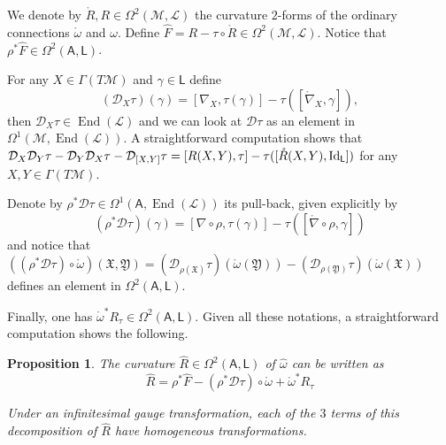 \documentclass[number]{elsarticle}
\newtheorem{proposition}[theorem]{Proposition}
\theoremstyle{definition}
\theoremstyle{remark}
\numberwithin{equation}{section}
\begin{document}
We denote by ${{\mathring{{R}}}}, R \in \Omega^2({{{{\mathcal{{M}}}}}}, {{{{\mathcal{{L}}}}}})$ the curvature $2$-forms of the ordinary connections ${{\mathring{{\omega}}}}$ and $\omega$. Define ${{\widehat{F}}} = R - {\tau} \circ {{\mathring{{R}}}} \in \Omega^2({{{{\mathcal{{M}}}}}}, {{{{\mathcal{{L}}}}}})$. Notice that $\rho^\ast {{\widehat{F}}} \in \Omega^2({{{{\mathbf{\mathsf{{A}}}}}}}, {{{{\mathbf{\mathsf{{L}}}}}}})$.

For any $X \in \Gamma(T{{{{\mathcal{{M}}}}}})$ and $\gamma \in {{{{\mathbf{\mathsf{{L}}}}}}}$ define
\begin{equation*}
({{\mathcal D}}_X {\tau})(\gamma) = [\nabla_X, {\tau}(\gamma)] - {\tau}([{{\mathring{{\nabla}}}}_X, \gamma]),
\end{equation*}
then ${{\mathcal D}}_X {\tau} \in \operatorname{End}({{{{\mathcal{{L}}}}}})$ and we can look at ${{\mathcal D}} {\tau}$ as an element in $\Omega^1({{{{\mathcal{{M}}}}}}, \operatorname{End}({{{{\mathcal{{L}}}}}}))$. A straightforward computation shows that ${{\mathcal D}}_X{{\mathcal D}}_Y {\tau} - {{\mathcal D}}_Y{{\mathcal D}}_X {\tau} - {{\mathcal D}}_{[X,Y]} {\tau} = [R(X,Y), {\tau}] - {\tau}([{{\mathring{{R}}}}(X,Y), {{\text{\textup{Id}}}}_{{{{\mathbf{\mathsf{{L}}}}}}}])$ for any $X,Y \in \Gamma(T{{{{\mathcal{{M}}}}}})$. 

Denote by $\rho^\ast {{\mathcal D}} {\tau} \in \Omega^1({{{{\mathbf{\mathsf{{A}}}}}}}, \operatorname{End}({{{{\mathcal{{L}}}}}}))$ its pull-back, given explicitly by
\begin{equation*}
(\rho^\ast {{\mathcal D}} {\tau})(\gamma) = [\nabla \circ \rho, {\tau}(\gamma)] - {\tau}([{{\mathring{{\nabla}}}} \circ \rho, \gamma])
\end{equation*}
and notice that $((\rho^\ast {{\mathcal D}} {\tau})\circ {{\mathring{{\omega}}}})({{\mathfrak X}},{{\mathfrak Y}}) = ({{\mathcal D}}_{\rho({{\mathfrak X}})} {\tau})({{\mathring{{\omega}}}}({{\mathfrak Y}})) - ({{\mathcal D}}_{\rho({{\mathfrak Y}})} {\tau})({{\mathring{{\omega}}}}({{\mathfrak X}}))$ defines an element in $\Omega^2({{{{\mathbf{\mathsf{{A}}}}}}}, {{{{\mathbf{\mathsf{{L}}}}}}})$.

Finally, one has ${{\mathring{{\omega}}}}^\ast R_{\tau} \in \Omega^2({{{{\mathbf{\mathsf{{A}}}}}}}, {{{{\mathbf{\mathsf{{L}}}}}}})$. Given all these notations, a straightforward computation shows the following.

\begin{proposition}
\label{prop-decompositionglobalcurvature}
The curvature ${\widehat{R}} \in \Omega^2({{{{\mathbf{\mathsf{{A}}}}}}},{{{{\mathbf{\mathsf{{L}}}}}}})$ of ${\widehat{\omega}}$ can be written as
\begin{equation}
\label{eq-decompositioncurvature}
{\widehat{R}}=
\rho^\ast {{\widehat{F}}}
- (\rho^\ast {{\mathcal D}} {\tau})\circ {{\mathring{{\omega}}}}
+ {{\mathring{{\omega}}}}^\ast R_{\tau}
\end{equation}

Under an infinitesimal gauge transformation, each of the $3$ terms of this decomposition of ${\widehat{R}}$ have homogeneous transformations.
\end{proposition}
\end{document}
